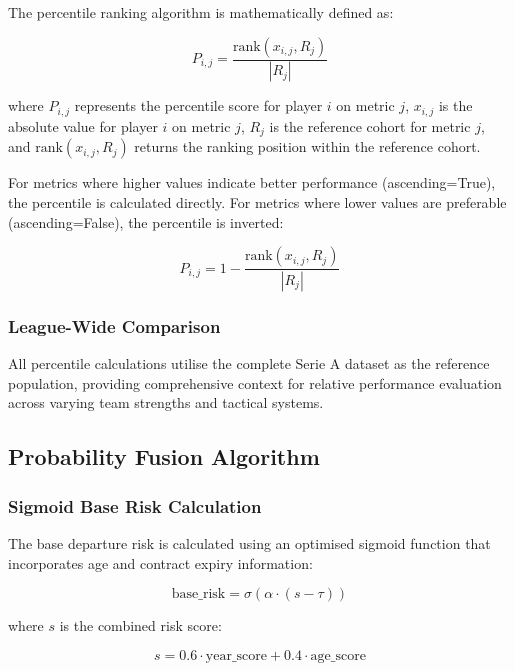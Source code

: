 The percentile ranking algorithm is mathematically defined as:

\begin{equation}
P_{i,j} = \frac{\text{rank}(x_{i,j}, R_j)}{|R_j|}
\end{equation}

where $P_{i,j}$ represents the percentile score for player $i$ on metric $j$, $x_{i,j}$ is the absolute value for player $i$ on metric $j$, $R_j$ is the reference cohort for metric $j$, and $\text{rank}(x_{i,j}, R_j)$ returns the ranking position within the reference cohort.

For metrics where higher values indicate better performance (ascending=True), the percentile is calculated directly. For metrics where lower values are preferable (ascending=False), the percentile is inverted:

\begin{equation}
P_{i,j} = 1 - \frac{\text{rank}(x_{i,j}, R_j)}{|R_j|}
\end{equation}

\subsubsection{League-Wide Comparison}

All percentile calculations utilise the complete Serie A dataset as the reference population, providing comprehensive context for relative performance evaluation across varying team strengths and tactical systems.

\subsection{Probability Fusion Algorithm}

\subsubsection{Sigmoid Base Risk Calculation}

The base departure risk is calculated using an optimised sigmoid function that incorporates age and contract expiry information:

\begin{equation}
\text{base\_risk} = \sigma(\alpha \cdot (s - \tau))
\end{equation}

where $s$ is the combined risk score:

\begin{equation}
s = 0.6 \cdot \text{year\_score} + 0.4 \cdot \text{age\_score}
\end{equation}

